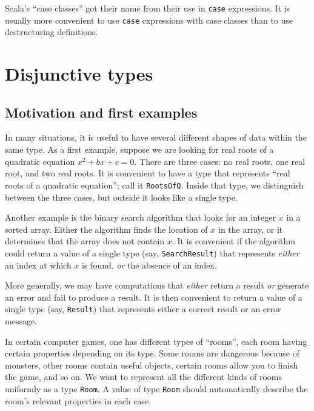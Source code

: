 Scala\textsf{'}s \textsf{``}case classes\textsf{''} got their name from their use in \lstinline!case!
expressions. It is usually more convenient to use \lstinline!case!
expressions with case classes than to use destructuring definitions.

\section{Disjunctive types}

\subsection{Motivation and first examples\label{subsec:Disjunctive-Motivation-and-first-examples}}

In many situations, it is useful to have several different shapes
of data within the same type. As a first example, suppose we are looking
for real roots of a quadratic equation $x^{2}+bx+c=0$. There are
three cases: no real roots, one real root, and two real roots. It
is convenient to have a type that represents \textsf{``}real roots of a quadratic
equation\textsf{''}; call it \lstinline!RootsOfQ!. Inside that type, we distinguish
between the three cases, but outside it looks like a single type.

Another example is the binary search algorithm that looks for an integer
$x$ in a sorted array. Either the algorithm finds the location of
$x$ in the array, or it determines that the array does not contain
$x$. It is convenient if the algorithm could return a value of a
single type (say, \lstinline!SearchResult!) that represents \emph{either}
an index at which $x$ is found, \emph{or} the absence of an index.

More generally, we may have computations that \emph{either} return
a result \emph{or} generate an error and fail to produce a result.
It is then convenient to return a value of a single type (say, \lstinline!Result!)
that represents either a correct result or an error message. 

In certain computer games, one has different types of \textsf{``}rooms\textsf{''},
each room having certain properties depending on its type. Some rooms
are dangerous because of monsters, other rooms contain useful objects,
certain rooms allow you to finish the game, and so on. We want to
represent all the different kinds of rooms uniformly as a type \lstinline!Room!.
A value of type \lstinline!Room! should automatically describe the
room\textsf{'}s relevant properties in each case.

